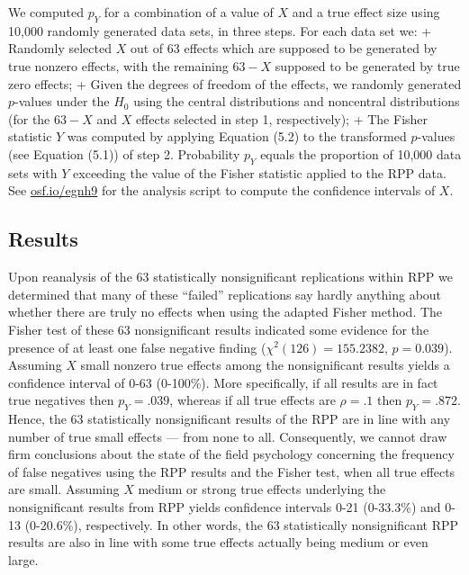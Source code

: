 \documentclass[a5paper]{book}
\begin{document}
We computed \(p_Y\) for a combination of a value of \(X\) and a true
effect size using 10,000 randomly generated data sets, in three steps.
For each data set we: + Randomly selected \(X\) out of 63 effects which
are supposed to be generated by true nonzero effects, with the remaining
\(63-X\) supposed to be generated by true zero effects; + Given the
degrees of freedom of the effects, we randomly generated \(p\)-values
under the \(H_0\) using the central distributions and noncentral
distributions (for the \(63-X\) and \(X\) effects selected in step 1,
respectively); + The Fisher statistic \(Y\) was computed by applying
Equation (5.2) to the transformed \(p\)-values (see Equation (5.1)) of
step 2. Probability \(p_Y\) equals the proportion of 10,000 data sets
with \(Y\) exceeding the value of the Fisher statistic applied to the
RPP data. See \href{https://osf.io/egnh9}{osf.io/egnh9} for the analysis
script to compute the confidence intervals of \(X\).

\subsection{Results}\label{results-2}

Upon reanalysis of the 63 statistically nonsignificant replications
within RPP we determined that many of these \enquote{failed}
replications say hardly anything about whether there are truly no
effects when using the adapted Fisher method. The Fisher test of these
63 nonsignificant results indicated some evidence for the presence of at
least one false negative finding (\(\chi^2(126)=155.2382\),
\(p=0.039\)). Assuming \(X\) small nonzero true effects among the
nonsignificant results yields a confidence interval of 0-63 (0-100\%).
More specifically, if all results are in fact true negatives then
\(p_Y=.039\), whereas if all true effects are \(\rho=.1\) then
\(p_Y=.872\). Hence, the 63 statistically nonsignificant results of the
RPP are in line with any number of true small effects --- from none to
all. Consequently, we cannot draw firm conclusions about the state of
the field psychology concerning the frequency of false negatives using
the RPP results and the Fisher test, when all true effects are small.
Assuming \(X\) medium or strong true effects underlying the
nonsignificant results from RPP yields confidence intervals 0-21
(0-33.3\%) and 0-13 (0-20.6\%), respectively. In other words, the 63
statistically nonsignificant RPP results are also in line with some true
effects actually being medium or even large.
\end{document}

